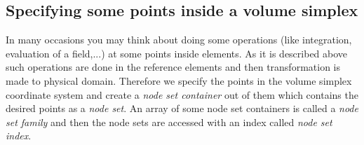 \documentclass[BoSSSForSolvingConservationLaws.tex]{subfiles}
\begin{document}
\subsection{Specifying some points inside a volume simplex}
In many occasions you may think about doing some operations (like integration, evaluation of a field,...) at some points inside elements. As it is described above such operations are done in the reference elements and then transformation is made to physical domain. Therefore we specify the points in the volume simplex coordinate system and create a \emph{node set container} out of them which contains the desired points as a \emph{node set}. An array of some node set containers is called a \emph{node set family} and then the node sets are accessed with an index called \emph{node set index}.
\end{document}
